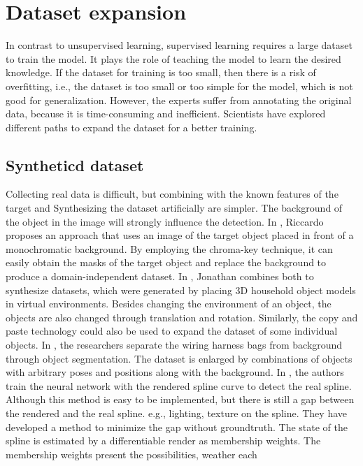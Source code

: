 \section{Dataset expansion}
    In contrast to unsupervised learning, supervised learning requires a large dataset to train the model. It plays the role of teaching the model to learn the desired knowledge.
    If the dataset for training is too small, then there is a risk of overfitting, i.e., the dataset is too small or too simple for the model, which is not good for generalization.
    However, the experts suffer from annotating the original data, because it is time-consuming and inefficient. Scientists have explored different paths to expand the dataset 
    for a better training. 
\subsection{Syntheticd dataset}
    Collecting real data is difficult, but combining with the known features of the target and Synthesizing the dataset artificially are simpler. The background of the object in the 
    image will strongly influence the detection. 
    In \cite{9349395}, Riccardo proposes an approach that uses an image of the target object placed in front of a monochromatic background. By employing the chroma-key technique,
    it can easily obtain the masks of the target object and replace the background to produce a domain-independent dataset. In \cite{Tremblay_2018_CVPR_Workshops}, Jonathan combines 
    both to synthesize datasets, which were generated by placing 3D household object models in virtual environments. Besides changing the environment of an object, the objects are 
    also changed through translation and rotation. Similarly, the copy and paste technology could also be used to expand the dataset of some individual objects. In \cite{10196168},
    the researchers separate the wiring harness bags from background through object segmentation. The dataset is enlarged by combinations of objects with arbitrary 
    poses and positions along with the background.
    In \cite{8972568}, the authors train the neural network with the rendered spline curve to detect the real spline. Although this 
    method is easy to be implemented, but there is still a gap between the rendered and the real spline. e.g., lighting, texture on the spline. They have developed a method to minimize
    the gap without groundtruth. The state of the spline is estimated by a differentiable render as membership weights. The membership weights present the possibilities, weather each 
